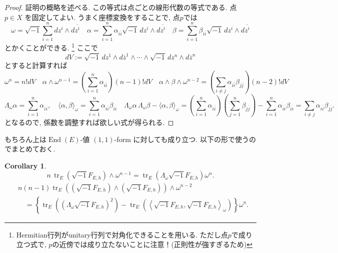 \documentclass[dvipdfmx,a4paper,11pt]{article} %
\newtheorem{cor}[thm]{Corollary}
\theoremstyle{definition}
\theoremstyle{remark}
\numberwithin{equation}{section}
\newcommand{\End}[0]{\operatorname{End}}
\begin{document}
\begin{proof}
証明の概略を述べる. この等式は点ごとの線形代数の等式である. 
点 \(p\in X\) を固定してよい. 
うまく座標変換をすることで, 点$p$では
\[
\omega
=
\sqrt{-1}\sum_{i=1}^n dz^i\wedge d\overline{z^i}
\quad
\alpha
=
\sum_{i=1}^{n}\alpha_{i\overline i}
\sqrt{-1}\,dz^i\wedge d\overline{z^i}
\quad
\beta
=
\sum_{i=1}^{n}\beta_{i\overline i}
\sqrt{-1}\,dz^i\wedge d\overline{z^i}
\]
とかくことができる. \footnote{Hermitian行列がunitary行列で対角化できることを用いる. ただし点$p$で成り立つ式で, $p$の近傍では成り立たないことに注意！(正則性が強すぎるため)}
ここで
$$
dV:=\sqrt{-1}\,dz^1\wedge d\overline z^1 \wedge \cdots \wedge \sqrt{-1}\,dz^n\wedge d\overline z^n
$$
とすると計算すれば
\[
\omega^n
=
n!dV
\quad
\alpha \wedge \omega^{n-1}
=\left(\sum_{i=1}^{n}\alpha_{i\overline i} \right)
(n-1)!dV
\quad
\alpha \wedge \beta \wedge \omega^{n-2}
=
\left(\sum_{i\neq j}\alpha_{i\overline i}\beta_{j\overline j}\right)(n-2)!dV
\]
\[
\Lambda_\omega\alpha
=
\sum_{i=1}^{n} \alpha_{i\overline i},
\quad
\langle\alpha,\beta\rangle_\omega
=
\sum_{i=1}^{n}\alpha_{i\overline i}\beta_{i\overline i}
\quad
\Lambda_\omega\alpha\,\Lambda_\omega\beta
-
\langle\alpha,\beta\rangle_\omega
=
\left(\sum_{i=1}^{n}\alpha_{i\overline i}\right)\left(\sum_{j=1}^{n} \beta_{j\overline j}\right)
-
\sum_{i=1}^{n} \alpha_{i\overline i} \beta_{i\overline i}
=
\sum_{i\neq j}\alpha_{i\overline i}\beta_{j\overline j}.
\]
となるので, 係数を調整すれば欲しい式が得られる. 
\end{proof}

もちろん上は\(\End(E)\)-値 \((1,1)\)-form に対しても成り立つ. 
以下の形で使うのでまとめておく.


\begin{cor}
\label{cor-lambda-formula}
\[
 n\,\operatorname{tr}_E
 \left(\sqrt{-1} F_{E,h} \right)\wedge \omega^{n-1}
=
\operatorname{tr}_E
\left(\Lambda_\omega  \sqrt{-1} F_{E,h} \right) \omega^n .
\]
\[
\begin{aligned}
&n (n-1)
\operatorname{tr}_E\left(
(\sqrt{-1} F_{E,h})\wedge(\sqrt{-1} F_{E,h})
\right)\wedge \omega^{n-2}
\\
&\quad =
\left\{
\operatorname{tr}_E
\left(
\left(\Lambda_{\omega}\sqrt{-1} F_{E,h}\right)^2
\right)
-
\operatorname{tr}_E\left(
\left\langle \sqrt{-1} F_{E,h}, \sqrt{-1}F_{E,h}\right\rangle_{\omega}
\right)
\right\}
\omega^n .
\end{aligned}
\]
\end{cor}
\end{document}
